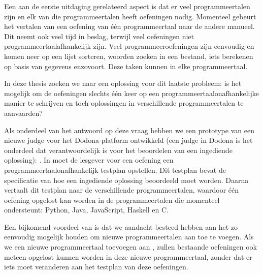 Een aan de eerste uitdaging gerelateerd aspect is dat er veel programmeertalen zijn en elk van die programmeertalen heeft oefeningen nodig.
Momenteel gebeurt het vertalen van een oefening van één programmeertaal naar de andere manueel.
Dit neemt ook veel tijd in beslag, terwijl veel oefeningen niet programmeertaalafhankelijk zijn.
Veel programmeeroefeningen zijn eenvoudig en komen neer op een lijst sorteren, woorden zoeken in een bestand, iets berekenen op basis van gegevens enzovoort.
Deze taken kunnen in elke programmeertaal.

In deze thesis zoeken we naar een oplossing voor dit laatste probleem: is het mogelijk om de oefeningen slechts één keer op een programmeertaalonafhankelijke manier te schrijven en toch oplossingen in verschillende programmeertalen te aanvaarden?

Als onderdeel van het antwoord op deze vraag hebben we een prototype van een nieuwe judge voor het Dodona-platform ontwikkeld (een judge in Dodona is het onderdeel dat verantwoordelijk is voor het beoordelen van een ingediende oplossing): \tested{}.
In \tested{} moet de lesgever voor een oefening een programmeertaalonafhankelijk testplan opstellen.
Dit testplan bevat de specificatie van hoe een ingediende oplossing beoordeeld moet worden.
Daarna vertaalt \tested{} dit testplan naar de verschillende programmeertalen, waardoor één oefening opgelost kan worden in de programmeertalen die \tested{} momenteel ondersteunt: Python, Java, JavaScript, Haskell en C.\@

Een bijkomend voordeel van \tested{} is dat we aandacht besteed hebben aan het zo eenvoudig mogelijk houden om nieuwe programmeertalen aan \tested{} toe te voegen.
Als we een nieuwe programmeertaal toevoegen aan \tested{}, zullen bestaande oefeningen ook meteen opgelost kunnen worden in deze nieuwe programmeertaal, zonder dat er iets moet veranderen aan het testplan van deze oefeningen.